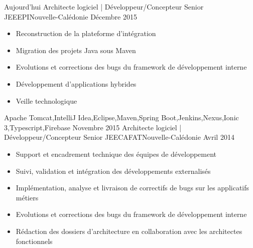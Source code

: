 %
%
%

\begin{experiences}
  \experience
    {Aujourd'hui}   {Architecte logiciel | Développeur/Concepteur Senior JEE}{EPI}{Nouvelle-Calédonie}
    {Décembre 2015} {
                      \begin{itemize}
                        \item Reconstruction de la plateforme d'intégration                        
                        \item Migration des projets Java sous Maven                    
                        \item Evolutions et corrections des bugs du framework de développement interne  
                        \item Développement d'applications hybrides              
                        \item Veille technologique                                                                    
                      \end{itemize}
                    }
                    {Apache Tomcat,IntelliJ Idea,Eclipse,Maven,Spring Boot,Jenkins,Nexus,Ionic 3,Typescript,Firebase}
  \emptySeparator
  \experience
    {Novembre 2015} {Architecte logiciel | Développeur/Concepteur Senior JEE}{CAFAT}{Nouvelle-Calédonie}
    {Avril 2014}    {
                      \begin{itemize}
                        \item Support et encadrement technique des équipes de développement                           
                        \item Suivi, validation et intégration des développements externalisés                        
                        \item Implémentation, analyse et livraison de correctifs de bugs sur les applicatifs métiers  
                        \item Evolutions et corrections des bugs du framework de développement interne                
                        \item Rédaction des dossiers d'architecture en collaboration avec les architectes fonctionnels

\end{itemize}}
\end{experiences}
